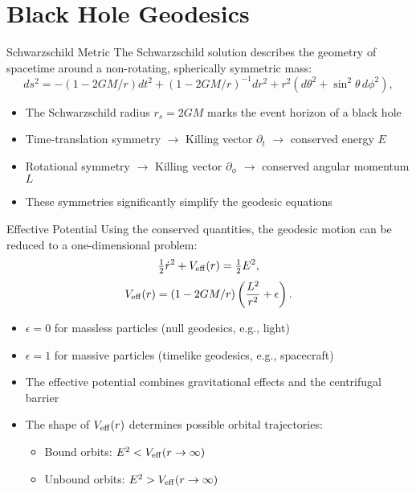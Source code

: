 \documentclass{beamer}
\begin{document}
\section{Black Hole Geodesics}
\begin{frame}{Schwarzschild Metric}
  The Schwarzschild solution describes the geometry of spacetime around a non-rotating, spherically symmetric mass:
  \[ds^2=-(1-2GM/r)dt^2+(1-2GM/r)^{-1}dr^2+r^2(d\theta^2 + \sin^2\theta\,d\phi^2),\]
  \begin{itemize}[<+->]
    \item The Schwarzschild radius $r_s = 2GM$ marks the event horizon of a black hole
    \item Time-translation symmetry $\to$ Killing vector $\partial_t$ $\to$ conserved energy $E$
    \item Rotational symmetry $\to$ Killing vector $\partial_\phi$ $\to$ conserved angular momentum $L$
    \item These symmetries significantly simplify the geodesic equations
  \end{itemize}
\end{frame}

\begin{frame}{Effective Potential}
  Using the conserved quantities, the geodesic motion can be reduced to a one-dimensional problem:
  \[ \tfrac12\dot{r}^2 + V_{\rm eff}(r)=\tfrac12E^2, \]
  \[ V_{\rm eff}(r)=(1-2GM/r)\left(\frac{L^2}{r^2}+\epsilon\right). \]
  \begin{itemize}[<+->]
    \item $\epsilon=0$ for massless particles (null geodesics, e.g., light)
    \item $\epsilon=1$ for massive particles (timelike geodesics, e.g., spacecraft)
    \item The effective potential combines gravitational effects and the centrifugal barrier
    \item The shape of $V_{\rm eff}(r)$ determines possible orbital trajectories:
      \begin{itemize}
        \item Bound orbits: $E^2 < V_{\rm eff}(r \to \infty)$
        \item Unbound orbits: $E^2 > V_{\rm eff}(r \to \infty)$
      \end{itemize}
  \end{itemize}
\end{frame}
\end{document}
